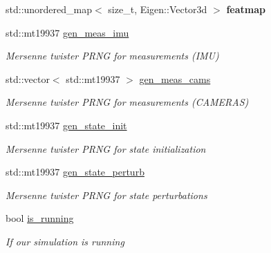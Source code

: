 \begin{DoxyCompactItemize}
std\+::unordered\+\_\+map$<$ size\+\_\+t, Eigen\+::\+Vector3d $>$ {\bfseries featmap}
\item 
\mbox{\label{classov__msckf_1_1Simulator_a5a21cc7b02ea84f58193093a3066cb52}} 
std\+::mt19937 \hyperlink{classov__msckf_1_1Simulator_a5a21cc7b02ea84f58193093a3066cb52}{gen\+\_\+meas\+\_\+imu}
\begin{DoxyCompactList}\small\item\em Mersenne twister P\+R\+NG for measurements (I\+MU) \end{DoxyCompactList}\item 
\mbox{\label{classov__msckf_1_1Simulator_a31b3202d5b9b277bc695970b4f1beeb9}} 
std\+::vector$<$ std\+::mt19937 $>$ \hyperlink{classov__msckf_1_1Simulator_a31b3202d5b9b277bc695970b4f1beeb9}{gen\+\_\+meas\+\_\+cams}
\begin{DoxyCompactList}\small\item\em Mersenne twister P\+R\+NG for measurements (C\+A\+M\+E\+R\+AS) \end{DoxyCompactList}\item 
\mbox{\label{classov__msckf_1_1Simulator_a4933a78e8768bdbc0bac91572f6b6d42}} 
std\+::mt19937 \hyperlink{classov__msckf_1_1Simulator_a4933a78e8768bdbc0bac91572f6b6d42}{gen\+\_\+state\+\_\+init}
\begin{DoxyCompactList}\small\item\em Mersenne twister P\+R\+NG for state initialization \end{DoxyCompactList}\item 
\mbox{\label{classov__msckf_1_1Simulator_a7e6903d5e046acabb9c177ba3dd2dbff}} 
std\+::mt19937 \hyperlink{classov__msckf_1_1Simulator_a7e6903d5e046acabb9c177ba3dd2dbff}{gen\+\_\+state\+\_\+perturb}
\begin{DoxyCompactList}\small\item\em Mersenne twister P\+R\+NG for state perturbations \end{DoxyCompactList}\item 
\mbox{\label{classov__msckf_1_1Simulator_a287cc404a867d549ec7c72613a884ee4}} 
bool \hyperlink{classov__msckf_1_1Simulator_a287cc404a867d549ec7c72613a884ee4}{is\+\_\+running}
\begin{DoxyCompactList}\small\item\em If our simulation is running \end{DoxyCompactList}\item 

\end{DoxyCompactItemize}

